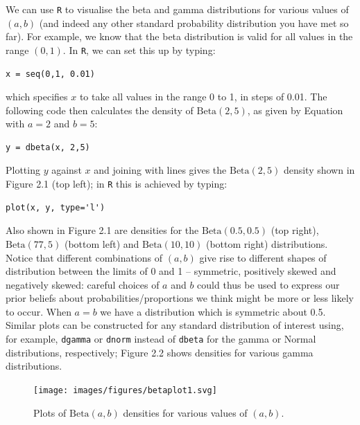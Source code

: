 \noindent We can use \texttt{R} to visualise the beta and gamma distributions for various values of $(a,b)$ (and indeed any other standard probability distribution you have met so far).  For example, we know that the beta distribution is valid for all values in the range $(0,1)$.  In \texttt{R}, we can set this up by typing:
\begin{verbatim}
x = seq(0,1, 0.01)
\end{verbatim}
which specifies $x$ to take all values in the range 0 to 1, in steps of 0.01.  The following code then calculates the density of $\mathrm{Beta}(2,5)$, as given by Equation  with $a=2$ and $b=5$:
\begin{verbatim}
y = dbeta(x, 2,5)
\end{verbatim}
Plotting $y$ against $x$ and joining with lines gives the $\mathrm{Beta}(2,5)$ density shown in Figure 2.1 (top left); in \texttt{R} this is achieved by typing:
\begin{verbatim}
plot(x, y, type='l')
\end{verbatim}
\noindent Also shown in Figure 2.1 are densities for the $\mathrm{Beta}(0.5,0.5)$ (top right), $\mathrm{Beta}(77,5)$ (bottom left) and  $\mathrm{Beta}(10,10)$ (bottom right) distributions.  Notice that different combinations of $(a,b)$ give rise to different shapes of distribution between the limits of 0 and 1 -- symmetric, positively skewed and negatively skewed: careful choices of $a$ and $b$ could thus be used to express our prior beliefs about probabilities/proportions we think might be more or less likely to occur.  When $a=b$ we have a distribution which is symmetric about 0.5.  Similar plots can be constructed for any standard distribution of interest using, for example, \texttt{dgamma} or \texttt{dnorm} instead of \texttt{dbeta} for the gamma or Normal distributions, respectively; Figure 2.2 shows densities for various gamma distributions.\begin{figure}[!h]
\centering
\texttt{[image: images/figures/betaplot1.svg]}
\caption{Plots of $\mathrm{Beta}(a,b)$ densities for various values of $(a,b)$.}
\end{figure}




